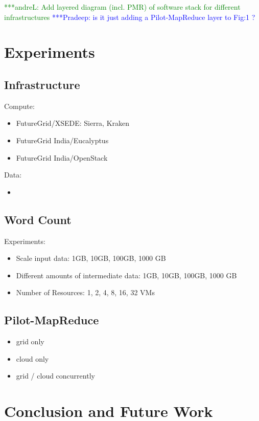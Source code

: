 \documentclass[times]{cpeauth}
\newcommand{\alnote}[1]{ {\textcolor{green} { ***andreL: #1 }}}
\newcommand{\pmnote}[1]{ {\textcolor{blue} { ***Pradeep: #1 }}}
\newcommand{\alnote}[1]{}
\newcommand{\pmnote}[1]{}
\begin{document}
\alnote{Add layered diagram (incl. PMR) of software stack for different 
infrastructures}
\pmnote{ is it just adding a Pilot-MapReduce layer to Fig:1 ? }

\section{Experiments}

\subsection{Infrastructure}

Compute:
\begin{itemize}
	\item FutureGrid/XSEDE: Sierra, Kraken 
	\item FutureGrid India/Eucalyptus
	\item FutureGrid India/OpenStack
\end{itemize}

Data:
\begin{itemize}
	\item 
\end{itemize}

	
\subsection{Word Count}

Experiments:
\begin{itemize}
	\item  Scale input data: 1GB, 10GB, 100GB, 1000 GB
	\item  Different amounts of intermediate data: 1GB, 10GB, 100GB, 1000 GB
	\item  Number of Resources: 1, 2, 4, 8, 16, 32 VMs
\end{itemize}

\subsection{Pilot-MapReduce}
\begin{itemize}
	\item grid only
	\item cloud only
	\item grid / cloud concurrently
\end{itemize}

\section{Conclusion and Future Work}



\end{document}
